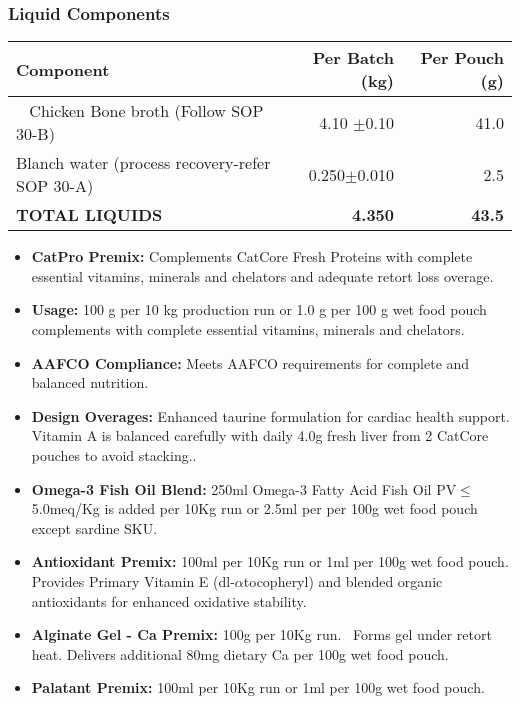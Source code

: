 \subsubsection*{Liquid Components}
\begin{tabular}{@{}lrr@{}}
\toprule
\textbf{Component} & \textbf{Per Batch (kg)} & \textbf{Per Pouch (g)} \\
\midrule 
Chicken Bone broth (Follow SOP 30-B) &  4.10 $\pm$0.10 & 41.0 \\
Blanch water (process recovery-refer SOP 30-A) & 0.250$\pm$0.010 & 2.5 \\
\textbf{TOTAL LIQUIDS} & \textbf{4.350} & \textbf{43.5} \\
\midrule

\bottomrule

\end{tabular}

\vspace{1em}

\begin{itemize}
\item \textbf{CatPro Premix:} Complements CatCore Fresh Proteins with complete essential vitamins, minerals and chelators and adequate retort loss overage.
\item \textbf{Usage:} 100 g per 10 kg production run or 1.0 g per 100 g wet food pouch complements with complete essential vitamins, minerals and chelators.
\item \textbf{AAFCO Compliance:} Meets AAFCO requirements for complete and balanced nutrition.
\item \textbf{Design Overages:} Enhanced taurine formulation for cardiac health support. Vitamin A is balanced carefully with daily 4.0g fresh liver from 2 CatCore pouches to avoid stacking.\cite{ref64}.  
\item \textbf{Omega-3 Fish Oil Blend:} 250ml Omega-3 Fatty Acid Fish Oil PV$\le$5.0meq/Kg is added per 10Kg run or 2.5ml per per 100g wet food pouch except sardine SKU.
\item \textbf{Antioxidant Premix:} 100ml per 10Kg run or 1ml per 100g wet food pouch. Provides Primary Vitamin E (dl-$\alpha$tocopheryl) and blended organic antioxidants for enhanced oxidative stability.
\item \textbf{Alginate Gel - Ca Premix:} 100g per 10Kg run.  Forms gel under retort heat. Delivers additional 80mg dietary Ca per 100g wet food pouch.
\item \textbf{Palatant Premix:} 100ml per 10Kg run or 1ml per 100g wet food pouch.
\end{itemize}
